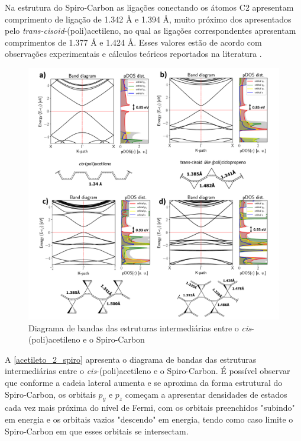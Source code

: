 	Na estrutura do Spiro-Carbon as ligações conectando os átomos C2 apresentam comprimento de ligação de 1.342 Å e 1.394 Å, muito próximo dos apresentados pelo \textit{trans-cisoid}-(poli)acetileno, no qual as ligações correspondentes apresentam comprimentos de 1.377 Å e 1.424 Å. Esses valores estão de acordo com observações experimentais e cálculos teóricos reportados na literatura \cite{chien1982estimate, chien2012polyacetylene, whangbo1979conjugated}.
	
	\begin{figure}[!ht]
		\centering
		\includegraphics[width=.9\linewidth]{capitulos/fig/results1/poliacetileno_2_spiro}
		\caption{Diagrama de bandas das estruturas intermediárias entre o \textit{cis}-(poli)acetileno e o Spiro-Carbon}
		\label{acetileto_2_spiro}
	\end{figure}

	A \autoref{acetileto_2_spiro} apresenta o diagrama de bandas das estruturas intermediárias entre o \textit{cis}-(poli)acetileno e o Spiro-Carbon. É possível observar que conforme a cadeia lateral aumenta e se aproxima da forma estrutural do Spiro-Carbon, os orbitais $p_y$ e $p_z$ começam a apresentar densidades de estados cada vez mais próxima do nível de Fermi, com os orbitais preenchidos "subindo" em energia e os orbitais vazios "descendo" em energia, tendo como caso limite o Spiro-Carbon em que esses orbitais se intersectam. 


